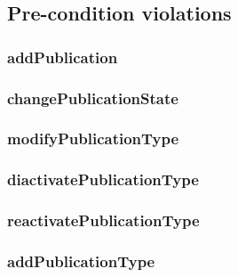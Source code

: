 \subsection{Pre-condition violations}
\subsubsection{addPublication}
\subsubsection{changePublicationState}
\subsubsection{modifyPublicationType}
\subsubsection{diactivatePublicationType}
\subsubsection{reactivatePublicationType}
\subsubsection{addPublicationType}